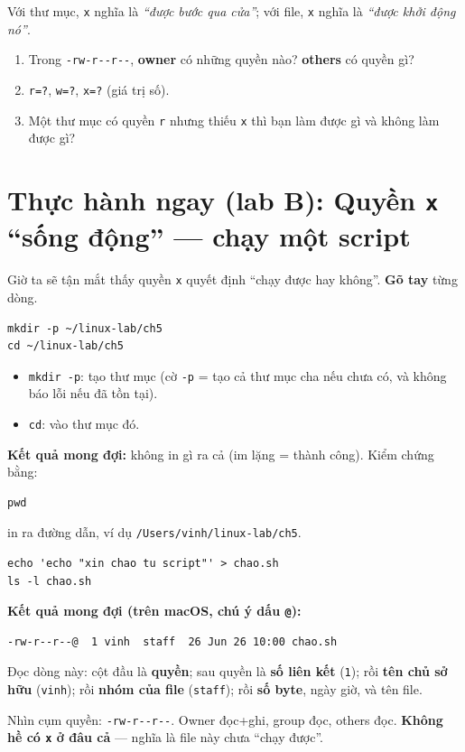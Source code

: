 \documentclass[12pt,a4paper]{article}
\newcommand{\cmd}[1]{\texttt{#1}}
\begin{document}
\begin{notebox}
Với thư mục, \cmd{x} nghĩa là \textit{``được bước qua cửa''}; với file, \cmd{x}
nghĩa là \textit{``được khởi động nó''}.
\end{notebox}

\begin{checkbox}
\begin{enumerate}
\item Trong \cmd{-rw-r-{}-r-{}-}, \textbf{owner} có những quyền nào? \textbf{others}
  có quyền gì?
\item \cmd{r=?}, \cmd{w=?}, \cmd{x=?} (giá trị số).
\item Một thư mục có quyền \cmd{r} nhưng thiếu \cmd{x} thì bạn làm được gì và không
  làm được gì?
\end{enumerate}
\end{checkbox}

\section{Thực hành ngay (lab B): Quyền \texttt{x} ``sống động'' --- chạy một script}

Giờ ta sẽ tận mắt thấy quyền \cmd{x} quyết định ``chạy được hay không''. \textbf{Gõ
tay} từng dòng.

\begin{labbox}
\begin{Verbatim}
mkdir -p ~/linux-lab/ch5
cd ~/linux-lab/ch5
\end{Verbatim}
\begin{itemize}
\item \cmd{mkdir -p}: tạo thư mục (cờ \cmd{-p} = tạo cả thư mục cha nếu chưa có, và
  không báo lỗi nếu đã tồn tại).
\item \cmd{cd}: vào thư mục đó.
\end{itemize}
\textbf{Kết quả mong đợi:} không in gì ra cả (im lặng = thành công). Kiểm chứng bằng:
\begin{Verbatim}
pwd
\end{Verbatim}
in ra đường dẫn, ví dụ \cmd{/Users/vinh/linux-lab/ch5}.
\end{labbox}

\begin{labbox}
\begin{Verbatim}
echo 'echo "xin chao tu script"' > chao.sh
ls -l chao.sh
\end{Verbatim}
\textbf{Kết quả mong đợi (trên macOS, chú ý dấu \texttt{@}):}
\begin{Verbatim}
-rw-r--r--@  1 vinh  staff  26 Jun 26 10:00 chao.sh
\end{Verbatim}
Đọc dòng này: cột đầu là \textbf{quyền}; sau quyền là \textbf{số liên kết}
(\cmd{1}); rồi \textbf{tên chủ sở hữu} (\cmd{vinh}); rồi \textbf{nhóm của file}
(\cmd{staff}); rồi \textbf{số byte}, ngày giờ, và tên file.

Nhìn cụm quyền: \cmd{-rw-r-{}-r-{}-}. Owner đọc+ghi, group đọc, others đọc.
\textbf{Không hề có \cmd{x} ở đâu cả} --- nghĩa là file này chưa ``chạy được''.
\end{labbox}
\end{document}
